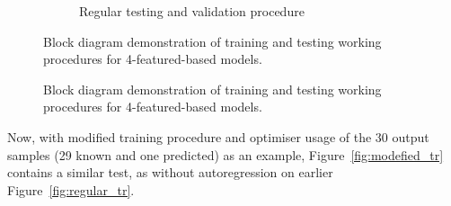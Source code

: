 {\begin{figure}[htbp]
\begin{subfigure}[b]{0.85\textwidth}
            \caption{Regular testing and validation procedure}
            \label{subfig:testing}
        \end{subfigure}
        \caption{Block diagram demonstration of training and testing working procedures for 4-featured-based models.}
        \label{fig:training_testing}
    \end{figure}
} {
    \begin{figure}[!t]
        \centering
        \label{subfig:training}
        \hfill
        \label{subfig:testing}
        \caption{Block diagram demonstration of training and testing working procedures for 4-featured-based models.}
        \label{fig:training_testing}
    \end{figure}
}
%
%
Now, with modified training procedure and optimiser usage of the 30 output samples (29 known and one predicted) as an example, \mbox{Figure~\ref{fig:modefied_tr}} contains a similar test, as without autoregression on earlier Figure~\ref{fig:regular_tr}.
